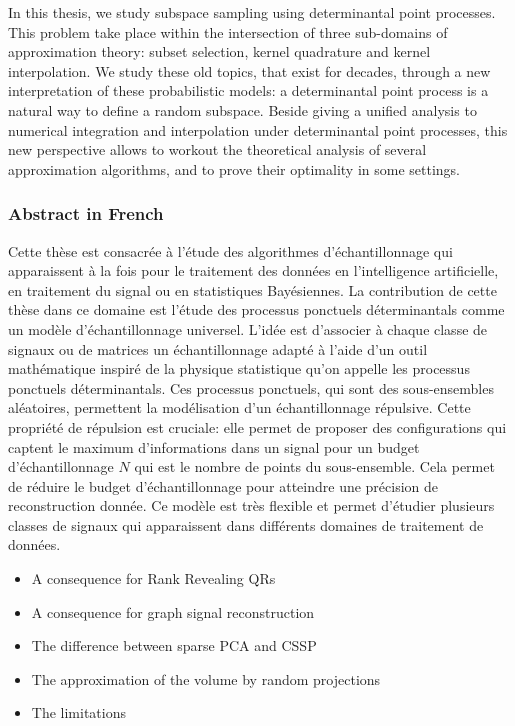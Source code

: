 \documentclass[twoside,11pt]{book}
\numberwithin{theorem}{chapter}
\numberwithin{definition}{chapter}
\numberwithin{proposition}{chapter}
\numberwithin{corollary}{chapter}
\numberwithin{example}{chapter}
\numberwithin{lemma}{chapter}
\numberwithin{assumption}{chapter}
\numberwithin{equation}{chapter}
\numberwithin{figure}{chapter}
\begin{document}
In this thesis, we study subspace sampling using determinantal point processes. This problem take place within the intersection of three sub-domains of approximation theory: subset selection, kernel quadrature and kernel interpolation. We study these old topics, that exist for decades, through a new interpretation of these probabilistic models: a determinantal point process is a natural way to define a random  subspace. Beside giving a unified analysis to numerical integration and interpolation under determinantal point processes, this new perspective allows to workout the theoretical analysis of several approximation algorithms, and to prove their optimality in some settings. 


\subsubsection{Abstract in French}
Cette thèse est consacrée à l'étude des algorithmes d'échantillonnage qui apparaissent à la fois pour le traitement des données en l'intelligence artificielle, en traitement du signal ou en statistiques Bayésiennes. La contribution de cette thèse dans ce domaine est l'étude des processus ponctuels déterminantals comme un modèle d'échantillonnage universel. L'idée est d'associer à chaque classe de signaux ou de matrices un échantillonnage adapté à l'aide d'un outil mathématique inspiré de la physique statistique qu'on appelle les processus ponctuels déterminantals. Ces processus ponctuels, qui sont des sous-ensembles aléatoires, permettent la modélisation d'un échantillonnage répulsive. Cette propriété de répulsion est cruciale: elle permet de proposer des configurations qui captent le maximum d'informations dans un signal pour un budget d'échantillonnage $N$ qui est le nombre de points du sous-ensemble. Cela permet de réduire le budget d'échantillonnage pour atteindre une précision de reconstruction donnée. Ce modèle est très flexible et permet d'étudier plusieurs classes de signaux qui apparaissent dans différents domaines de traitement de données.





\clearpage





\begin{itemize}
\item A consequence for Rank Revealing QRs
\item A consequence for graph signal reconstruction
\item The difference between sparse PCA and CSSP
\item The approximation of the volume by random projections
\item The limitations  
\end{itemize}
\end{document}
